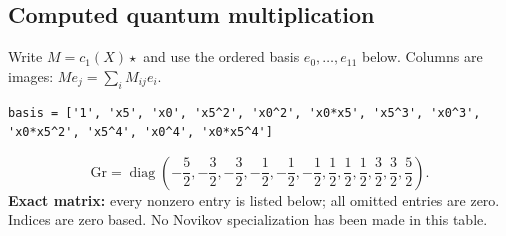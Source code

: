 \documentclass[10pt,a4paper]{article}
\begin{document}
\subsection*{Computed quantum multiplication}
Write $M=c_1(X)\star$ and use the ordered basis $e_0,\ldots,e_{11}$ below. Columns are images: $M e_j=\sum_i M_{ij}e_i$.
\begin{lstlisting}
basis = ['1', 'x5', 'x0', 'x5^2', 'x0^2', 'x0*x5', 'x5^3', 'x0^3', 'x0*x5^2', 'x5^4', 'x0^4', 'x0*x5^4']
\end{lstlisting}
\[\mathrm{Gr}=\operatorname{diag}\!\left(- \frac{5}{2},- \frac{3}{2},- \frac{3}{2},- \frac{1}{2},- \frac{1}{2},- \frac{1}{2},\frac{1}{2},\frac{1}{2},\frac{1}{2},\frac{3}{2},\frac{3}{2},\frac{5}{2}\right).\]
\textbf{Exact matrix:} every nonzero entry is listed below; all omitted entries are zero. Indices are zero based. No Novikov specialization has been made in this table.
\end{document}
